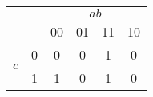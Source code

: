 \begin{tabular}{cc|cccc}
 & \multicolumn{1}{c}{} & \multicolumn{4}{c}{$ab$}\tabularnewline
 &  & 00 & 01 & 11 & 10\tabularnewline
\hline
\multirow{2}{*}{$c$} & 0 & 0 & 0 & 1 & 0\tabularnewline
 & 1 & 1 & 0 & 1 & 0\tabularnewline
\end{tabular}
